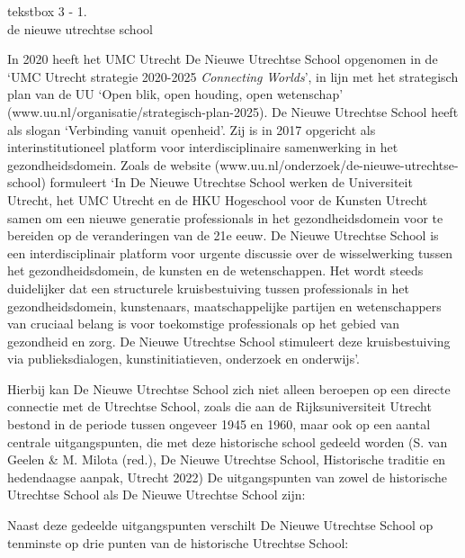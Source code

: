 \documentclass[empirical, authordate, ]{new-jote-article}
\begin{document}
	\begin{bookbox}{\raggedright tekstbox 3 - 1. \\de nieuwe utrechtse school}
		In 2020 heeft het UMC Utrecht De Nieuwe Utrechtse School opgenomen in de ‘UMC Utrecht strategie 2020-2025 \emph{Connecting}\emph{ }\emph{Worlds}', in lijn met het strategisch plan van de UU ‘Open blik, open houding, open wetenschap' (www.uu.nl/organisatie/strategisch-plan-2025). De Nieuwe Utrechtse School heeft als slogan ‘Verbinding vanuit openheid'. Zij is in 2017 opgericht als interinstitutioneel platform voor interdisciplinaire samenwerking in het gezondheidsdomein. Zoals de website (www.uu.nl/onderzoek/de-nieuwe-utrechtse-school) formuleert ‘In De Nieuwe Utrechtse School werken de Universiteit Utrecht, het UMC Utrecht en de HKU Hogeschool voor de Kunsten Utrecht samen om een nieuwe generatie professionals in het gezondheidsdomein voor te bereiden op de veranderingen van de 21e eeuw. De Nieuwe Utrechtse School is een interdisciplinair platform voor urgente discussie over de wisselwerking tussen het gezondheidsdomein, de kunsten en de wetenschappen. Het wordt steeds duidelijker dat een structurele kruisbestuiving tussen professionals in het gezondheidsdomein, kunstenaars, maatschappelijke partijen en wetenschappers van cruciaal belang is voor toekomstige professionals op het gebied van gezondheid en zorg. De Nieuwe Utrechtse School stimuleert deze kruisbestuiving via publieksdialogen, kunstinitiatieven, onderzoek en onderwijs'.

		\vspace*{\baselineskip}

		Hierbij kan De Nieuwe Utrechtse School zich niet alleen beroepen op een directe connectie met de Utrechtse School, zoals die aan de Rijksuniversiteit Utrecht bestond in de periode tussen ongeveer 1945 en 1960, maar ook op een aantal centrale uitgangspunten, die met deze historische school gedeeld worden (S. van Geelen \& M. Milota (red.), De Nieuwe Utrechtse School, Historische traditie en hedendaagse aanpak, Utrecht 2022) De uitgangspunten van zowel de historische Utrechtse School als De Nieuwe Utrechtse School zijn:

		\vspace*{\baselineskip}

		Naast deze gedeelde uitgangspunten verschilt De Nieuwe Utrechtse School op tenminste op drie punten van de historische Utrechtse School:

		\vspace*{\baselineskip}


\end{bookbox}
\end{document}
